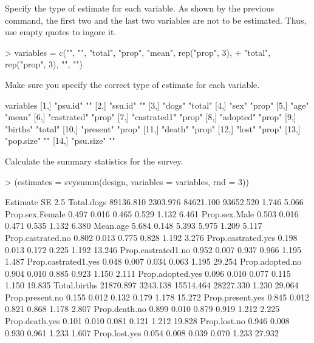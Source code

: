 \documentclass[a4paper]{article}
\begin{document}
Specify the type of estimate for each variable. As shown by the previous command, the first two and the last two variables are not to be estimated. Thus, use empty quotes to ingore it.
\begin{Schunk}
\begin{Sinput}
> variables = c("", "", "total", "prop", "mean", rep("prop", 3), 
+               "total", rep("prop", 3), "", "")
\end{Sinput}
\end{Schunk}

Make sure you specify the correct type of estimate for each variable.
\begin{Schunk}
\begin{Soutput}
                   variables
 [1,] "psu.id"     ""       
 [2,] "ssu.id"     ""       
 [3,] "dogs"       "total"  
 [4,] "sex"        "prop"   
 [5,] "age"        "mean"   
 [6,] "castrated"  "prop"   
 [7,] "castrated1" "prop"   
 [8,] "adopted"    "prop"   
 [9,] "births"     "total"  
[10,] "present"    "prop"   
[11,] "death"      "prop"   
[12,] "lost"       "prop"   
[13,] "pop.size"   ""       
[14,] "psu.size"   ""       
\end{Soutput}
\end{Schunk}

Calculate the summary statistics for the survey.
\begin{Schunk}
\begin{Sinput}
> (estimates = svysumm(design, variables = variables, rnd = 3))
\end{Sinput}
\begin{Soutput}
                     Estimate       SE     2.5 %
Total.dogs          89136.810 2303.976 84621.100 93652.520 1.746     5.066
Prop.sex.Female         0.497    0.016     0.465     0.529 1.132     6.461
Prop.sex.Male           0.503    0.016     0.471     0.535 1.132     6.380
Mean.age                5.684    0.148     5.393     5.975 1.209     5.117
Prop.castrated.no       0.802    0.013     0.775     0.828 1.192     3.276
Prop.castrated.yes      0.198    0.013     0.172     0.225 1.192    13.246
Prop.castrated1.no      0.952    0.007     0.937     0.966 1.195     1.487
Prop.castrated1.yes     0.048    0.007     0.034     0.063 1.195    29.254
Prop.adopted.no         0.904    0.010     0.885     0.923 1.150     2.111
Prop.adopted.yes        0.096    0.010     0.077     0.115 1.150    19.835
Total.births        21870.897 3243.138 15514.464 28227.330 1.230    29.064
Prop.present.no         0.155    0.012     0.132     0.179 1.178    15.272
Prop.present.yes        0.845    0.012     0.821     0.868 1.178     2.807
Prop.death.no           0.899    0.010     0.879     0.919 1.212     2.225
Prop.death.yes          0.101    0.010     0.081     0.121 1.212    19.828
Prop.lost.no            0.946    0.008     0.930     0.961 1.233     1.607
Prop.lost.yes           0.054    0.008     0.039     0.070 1.233    27.932
\end{Soutput}
\end{Schunk}
\end{document}
